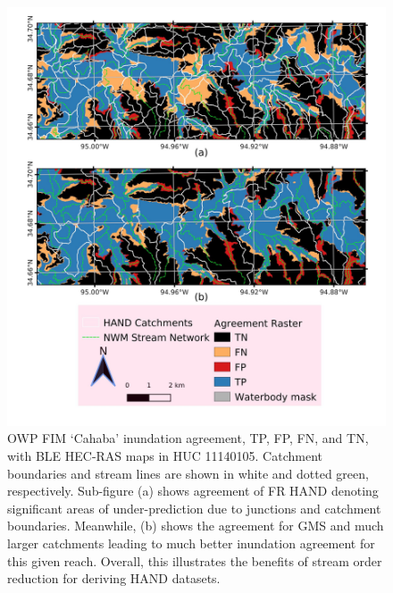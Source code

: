 %
%
\begin{figure}[h!]
\centering
\includegraphics[scale=1.0]{figures/gms_enhancement.jpg}
\caption{OWP FIM `Cahaba' inundation agreement, TP, FP, FN, and TN, with BLE HEC-RAS maps in HUC 11140105.
Catchment boundaries and stream lines are shown in white and dotted green, respectively.
Sub-figure (a) shows agreement of FR HAND denoting significant areas of under-prediction due to junctions and catchment boundaries.
Meanwhile, (b) shows the agreement for GMS and much larger catchments leading to much better inundation agreement for this given reach. 
Overall, this illustrates the benefits of stream order reduction for deriving HAND datasets.
}
\label{fig:gms_enhancement}
\end{figure}
%
